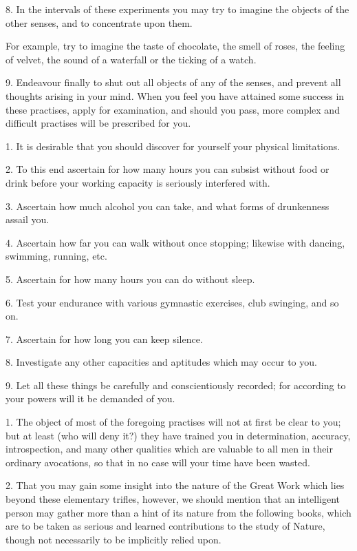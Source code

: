 8. In the intervals of these experiments you may try to imagine the objects of the other senses, and to concentrate upon them.

For example, try to imagine the taste of chocolate, the smell of roses, the feeling of velvet, the sound of a waterfall or the ticking of a watch.

9. Endeavour finally to shut out all objects of any of the senses, and prevent all thoughts arising in your mind. When you feel you have attained some success in these practises, apply for examination, and should you pass, more complex and difficult practises will be prescribed for you.


1. It is desirable that you should discover for yourself your physical limitations.

2. To this end ascertain for how many hours you can subsist without food or drink before your working capacity is seriously interfered with.

3. Ascertain how much alcohol you can take, and what forms of drunkenness assail you.

4. Ascertain how far you can walk without once stopping; likewise with dancing, swimming, running, etc.

5. Ascertain for how many hours you can do without sleep.

6. Test your endurance with various gymnastic exercises, club swinging, and so on.

7. Ascertain for how long you can keep silence.

8. Investigate any other capacities and aptitudes which may occur to you.

9. Let all these things be carefully and conscientiously recorded; for according to your powers will it be demanded of you.


1. The object of most of the foregoing practises will not at first be clear to you; but at least (who will deny it?) they have trained you in determination, accuracy, introspection, and many other qualities which are valuable to all men in their ordinary avocations, so that in no case will your time have been wasted.

2. That you may gain some insight into the nature of the Great Work which lies beyond these elementary trifles, however, we should mention that an intelligent person may gather more than a hint of its nature from the following books, which are to be taken as serious and learned contributions to the study of Nature, though not necessarily to be implicitly relied upon.

